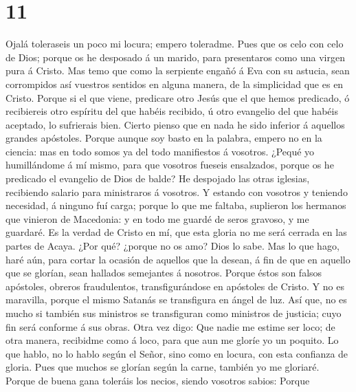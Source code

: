\hypertarget{section-10}{%
\section{11}\label{section-10}}

 Ojalá toleraseis un poco mi locura; empero toleradme.
 Pues que os celo con celo de Dios; porque os he desposado
á un marido, para presentaros como una virgen pura á Cristo.
 Mas temo que como la serpiente engañó á Eva con su
astucia, sean corrompidos así vuestros sentidos en alguna manera, de la
simplicidad que es en Cristo.  Porque si el que viene,
predicare otro Jesús que el que hemos predicado, ó recibiereis otro
espíritu del que habéis recibido, ú otro evangelio del que habéis
aceptado, lo sufrierais bien.  Cierto pienso que en nada
he sido inferior á aquellos grandes apóstoles.  Porque
aunque soy basto en la palabra, empero no en la ciencia: mas en todo
somos ya del todo manifiestos á vosotros.  ¿Pequé yo
humillándome á mí mismo, para que vosotros fueseis ensalzados, porque os
he predicado el evangelio de Dios de balde?  He despojado
las otras iglesias, recibiendo salario para ministraros á vosotros.
 Y estando con vosotros y teniendo necesidad, á ninguno
fuí carga; porque lo que me faltaba, suplieron los hermanos que vinieron
de Macedonia: y en todo me guardé de seros gravoso, y me guardaré.
 Es la verdad de Cristo en mí, que esta gloria no me será
cerrada en las partes de Acaya.  ¿Por qué? ¿porque no os
amo? Dios lo sabe.  Mas lo que hago, haré aún, para
cortar la ocasión de aquellos que la desean, á fin de que en aquello que
se glorían, sean hallados semejantes á nosotros.  Porque
éstos son falsos apóstoles, obreros fraudulentos, transfigurándose en
apóstoles de Cristo.  Y no es maravilla, porque el mismo
Satanás se transfigura en ángel de luz.  Así que, no es
mucho si también sus ministros se transfiguran como ministros de
justicia; cuyo fin será conforme á sus obras.  Otra vez
digo: Que nadie me estime ser loco; de otra manera, recibidme como á
loco, para que aun me gloríe yo un poquito.  Lo que
hablo, no lo hablo según el Señor, sino como en locura, con esta
confianza de gloria.  Pues que muchos se glorían según la
carne, también yo me gloriaré.  Porque de buena gana
toleráis los necios, siendo vosotros sabios:  Porque

